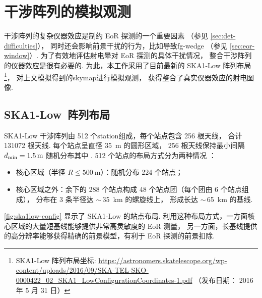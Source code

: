 \section{干涉阵列的模拟观测}
\label{sec:obs-simu}

干涉阵列的复杂仪器效应是制约 EoR 探测的一个重要因素
（参见 \autoref{sec:det-difficulties}），
同时还会影响前景干扰的行为，比如导致\ac{fg-wedge}
（参见 \autoref{sec:eor-window}）.
为了有效地评估射电晕对 EoR 探测的具体干扰情况，
整合干涉阵列的仪器效应是很有必要的.
为此，本工作采用了目前最新的 SKA1-Low 阵列布局\footnote{\raggedright%
  SKA1-Low 阵列布局坐标:
  \url{https://astronomers.skatelescope.org/wp-content/uploads/2016/09/SKA-TEL-SKO-0000422_02_SKA1_LowConfigurationCoordinates-1.pdf}
  （发布日期： 2016 年 5 月 31 日）}，
对上文模拟得到的\ac{skymap}进行模拟观测，
获得整合了真实仪器效应的射电图像.

\subsection{SKA1-Low~阵列布局}

SKA1-Low 干涉阵列由 512 个\ac{station}组成，每个站点包含 256 根天线，
合计 \num{131072} 根天线.
每个站点呈直径 \SI{35}{\meter} 的圆形区域，
256 根天线保持最小间隔 $d_{\mathrm{min}} = \SI{1.5}{\meter}$
随机分布其中 \cite{mort2017}.
512 个站点的布局方式分为两种情况 \cite{dewdney2016ska}：
\begin{itemize}
  \item 核心区域（半径 $R \le \SI{500}{\meter}$）：随机分布 224 个站点；
  \item 核心区域之外：余下的 288 个站点构成 48 个站点团（每个团由 6 个站点组成），
    分布在 3 条半径达 $\sim$\,\SI{35}{\km} 的螺旋线上，
    形成长达 $\sim$\,\SI{65}{\km} 的基线.
\end{itemize}
\autoref{fig:ska1low-config} 显示了 SKA1-Low 的站点布局.
利用这种布局方式，一方面核心区域的大量短基线能够提供非常高灵敏度的 EoR 测量，
另一方面，长基线提供的高分辨率能够获得精确的前景模型，有利于 EoR 探测的前景扣除.

